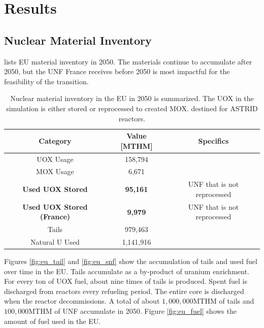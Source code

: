 \section{Results}

\subsection{Nuclear Material Inventory}

 lists \gls{EU} material inventory in 2050.
The materials continue to accumulate after 2050, but the
\gls{UNF} France receives before 2050 is most impactful for the
feasibility of the transition.


\begin{table}[h]
	\centering
		\begin{tabular}{ccc}
			\hline
			\textbf{Category } & \textbf{Value [MTHM]} & \textbf{Specifics}\\ \hline
			UOX Usage  & 158,794 &  \\ 
			MOX Usage  & 6,671  & \\ 
			\textbf{Used UOX Stored}  & \textbf{95,161}  & \gls{UNF} that is not reprocessed\\
			\textbf{Used UOX Stored (France)} & \textbf{9,979}  & \gls{UNF} that is not reprocessed \\
			Tails  & 979,463  & \\ 
			Natural U Used  & 1,141,916  & \\ \hline
		\end{tabular}
		\caption{Nuclear material inventory in the \gls{EU} in 2050 is
                  summarized. The \gls{UOX} in the simulation is either stored or reprocessed to 
                  created \gls{MOX}.  destined for \gls{ASTRID} reactors.}

		\label{tab:sim_result1}
\end {table}
\FloatBarrier


Figures \ref{fig:eu_tail} and \ref{fig:eu_snf} show the 
accumulation of tails and used fuel over time in the \gls{EU}.
Tails accumulate as a by-product of uranium enrichment. For every
ton of \gls{UOX} fuel, about nine times of tails is produced. 
Spent fuel is discharged from reactors every refueling period.
The entire core is discharged when the reactor decommissions.
A total of about $1,000,000$MTHM of tails and $100,000$MTHM of
\gls{UNF} accumulate in 2050.
Figure \ref{fig:eu_fuel} shows the amount of fuel used in the \gls{EU}.


